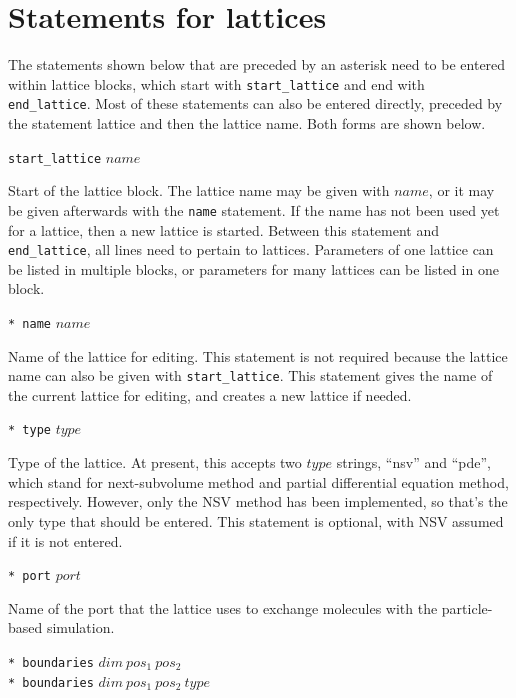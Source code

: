 \documentclass {book}
\newcommand {\ttt} {\texttt}
\begin{document}
\section{Statements for lattices}

The statements shown below that are preceded by an asterisk need to be entered within lattice blocks, which start with \ttt{start\_lattice} and end with \ttt{end\_lattice}. Most of these statements can also be entered directly, preceded by the statement lattice and then the lattice name. Both forms are shown below.

\begin{description}

\item{\ttt{start\_lattice} $name$}

Start of the lattice block. The lattice name may be given with $name$, or it may be given afterwards with the \ttt{name} statement. If the name has not been used yet for a lattice, then a new lattice is started. Between this statement and \ttt{end\_lattice}, all lines need to pertain to lattices. Parameters of one lattice can be listed in multiple blocks, or parameters for many lattices can be listed in one block.

\item{\ttt{* name} $name$}

Name of the lattice for editing. This statement is not required because the lattice name can also be given with \ttt{start\_lattice}. This statement gives the name of the current lattice for editing, and creates a new lattice if needed.

\item{\ttt{* type} $type$}

Type of the lattice. At present, this accepts two $type$ strings, ``nsv'' and ``pde'', which stand for next-subvolume method and partial differential equation method, respectively. However, only the NSV method has been implemented, so that's the only type that should be entered. This statement is optional, with NSV assumed if it is not entered.

\item{\ttt{* port} $port$}

Name of the port that the lattice uses to exchange molecules with the particle-based simulation.

\item{\ttt{* boundaries} $dim\ pos_1\ pos_2$\\
\ttt{* boundaries} $dim\ pos_1\ pos_2\ type$}


\end{description}
\end{document}
